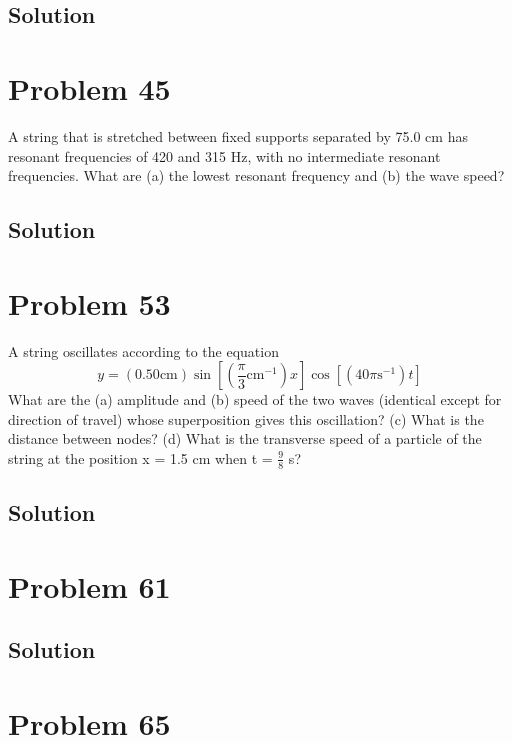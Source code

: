 \documentclass[12pt]{article}
\begin{document}
        \subsection{Solution}

    \section{Problem 45}
        A string that is stretched between fixed supports separated by 75.0 cm has resonant frequencies of 420 and 315 Hz, with no intermediate resonant frequencies. 
        What are (a) the lowest resonant frequency and (b) the wave speed?

        \subsection{Solution}

    \section{Problem 53}
        A string oscillates according to the equation
        \begin{equation}
            y = (0.50 \unit{\centi\meter}) \sin \left[  ( \frac{\pi}{3} \unit{\centi\meter^{-1}})x \right] \cos\left[ (40\pi \unit{\second^{-1}} )t \right]
        \end{equation}
        What are the (a) amplitude and (b) speed of the two waves (identical except for direction of travel) whose superposition gives this oscillation? 
        (c) What is the distance between nodes? 
        (d) What is the transverse speed of a particle of the string at the position x = 1.5 cm when t = $\frac{9}{8}$ s?

        \subsection{Solution}

    \pagebreak
    \section{Problem 61}

        \subsection{Solution}

    \pagebreak
    \section{Problem 65}
\end{document}
